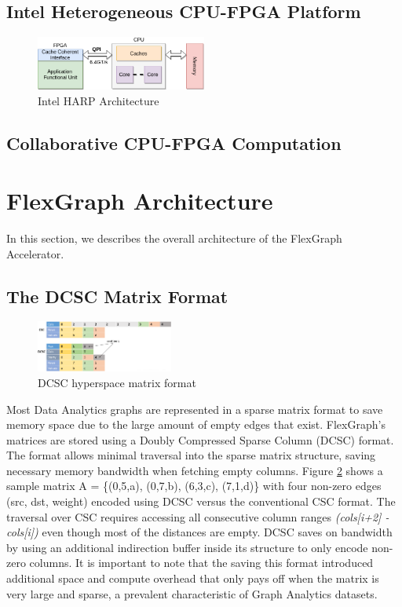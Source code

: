 \subsection{Intel Heterogeneous CPU-FPGA Platform}

\begin{figure}[htbp]
\centering
\includegraphics[width=0.5\textwidth]{figures/harp_arch}
\caption{Intel HARP Architecture}
\label{fig:harp_arch}
\end{figure}

\subsection{Collaborative CPU-FPGA Computation}

\section{FlexGraph Architecture}

In this section, we describes the overall architecture of the FlexGraph Accelerator.

\subsection{The DCSC Matrix Format}

\begin{figure}[htbp]
\centering
\includegraphics[width=0.4\textwidth]{figures/DCSC_matrix_format}
\caption{DCSC hyperspace matrix format}
\label{fig:DCSC_matrix_format}
\end{figure}

Most Data Analytics graphs are represented in a sparse matrix format to save memory space due to the large amount of empty edges that exist. FlexGraph's matrices are stored using a Doubly Compressed Sparse Column (DCSC) \cite{DCSC} format. The format allows minimal traversal into the sparse matrix structure, saving necessary memory bandwidth when fetching empty columns. Figure \ref{fig:DCSC_matrix_format} shows a sample matrix A = \{(0,5,a), (0,7,b), (6,3,c), (7,1,d)\} with four non-zero edges (src, dst, weight) encoded using DCSC versus the conventional CSC \cite{CSC} format. The traversal over CSC requires accessing all consecutive column ranges \textit{(cols[i+2] - cols[i])} even though most of the distances are empty. DCSC saves on bandwidth by using an additional indirection  buffer inside its structure to only encode non-zero columns. It is important to note that the saving this format introduced additional space and compute overhead that only pays off when the matrix is very large and sparse, a prevalent characteristic of Graph Analytics datasets.

